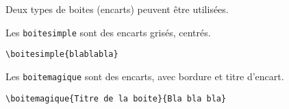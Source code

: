\documentclass[10pt,a4paper]{article}
\begin{document}
Deux types de boites (encarts) peuvent être utilisées. 

Les \verb!boitesimple! sont des encarts grisés, centrés.
\begin{Verbatim}[frame=single, framerule=0.2mm, rulecolor=\color{gray}, label= Une boite simple]
\boitesimple{blablabla}
\end{Verbatim}

Les \verb!boitemagique! sont des encarts, avec bordure et titre d'encart.

\begin{Verbatim}[frame=single, framerule=0.2mm, rulecolor=\color{gray}, label=Pour tracer une boite magique]
\boitemagique{Titre de la boite}{Bla bla bla}
\end{Verbatim}
\end{document}
